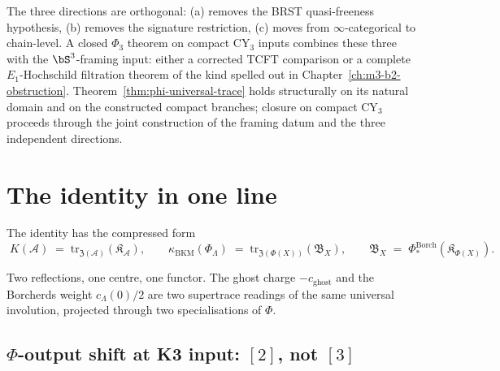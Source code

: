 The three directions are orthogonal: (a) removes the BRST
quasi-freeness hypothesis, (b) removes the signature restriction, (c)
moves from $\infty$-categorical to chain-level. A closed $\Phi_3$
theorem on compact CY$_3$ inputs combines these three with the
$\bS^3$-framing input: either a corrected TCFT comparison or a complete
$E_1$-Hochschild filtration theorem of the kind spelled out in
Chapter~\ref{ch:m3-b2-obstruction}. Theorem~\ref{thm:phi-universal-trace}
holds structurally on its natural domain and on the constructed compact
branches; closure on compact CY$_3$ proceeds through the joint
construction of the framing datum and the three independent directions.

\section{The identity in one line}
\label{sec:phi-trace-one-line}

The identity has the compressed form
\[
 \boxed{\;
 K(\mathcal{A}) \;=\; \mathrm{tr}_{\mathfrak{Z}(\mathcal{A})}(\mathfrak{K}_{\mathcal{A}}),
 \qquad
 \kappa_{\mathrm{BKM}}(\Phi_\Lambda) \;=\; \mathrm{tr}_{\mathfrak{Z}(\Phi(X))}(\mathfrak{B}_X),
 \qquad
 \mathfrak{B}_X \;=\; \Phi^{\mathrm{Borch}}_*(\mathfrak{K}_{\Phi(X)}).
 \;}
\]

Two reflections, one centre, one functor. The ghost charge
$-c_{\mathrm{ghost}}$ and the Borcherds weight $c_\Lambda(0)/2$ are
two supertrace readings of the same universal involution, projected
through two specialisations of $\Phi$.

\subsection{\texorpdfstring{$\Phi$}{Phi}-output shift at K3 input: \texorpdfstring{$[2]$}{[2]}, not \texorpdfstring{$[3]$}{[3]}}
\label{subsec:phi-output-shift-k3-bi-based}

